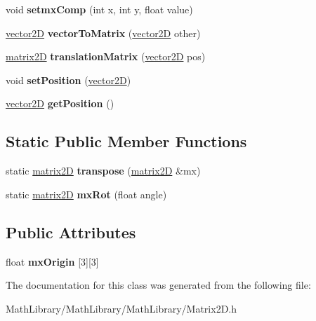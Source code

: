 \begin{DoxyCompactItemize}
\mbox{\label{classmatrix2_d_a939668139faca5cd4f52767a4db8c5e3}} 
void {\bfseries setmx\+Comp} (int x, int y, float value)
\item 
\mbox{\label{classmatrix2_d_ad98f4ee6d2e64acfde0c4ada1ccf0fcf}} 
\hyperlink{classvector2_d}{vector2D} {\bfseries vector\+To\+Matrix} (\hyperlink{classvector2_d}{vector2D} other)
\item 
\mbox{\label{classmatrix2_d_a23a306979fd8cecbfd7c1c8035d7e6bc}} 
\hyperlink{classmatrix2_d}{matrix2D} {\bfseries translation\+Matrix} (\hyperlink{classvector2_d}{vector2D} pos)
\item 
\mbox{\label{classmatrix2_d_aa422545fcd7ca7d549cb7273925295b9}} 
void {\bfseries set\+Position} (\hyperlink{classvector2_d}{vector2D})
\item 
\mbox{\label{classmatrix2_d_a7584dc759e94ed1a062493d081d79813}} 
\hyperlink{classvector2_d}{vector2D} {\bfseries get\+Position} ()
\end{DoxyCompactItemize}
\subsection*{Static Public Member Functions}
\begin{DoxyCompactItemize}
\item 
\mbox{\label{classmatrix2_d_a67d111b5a9ae50d68b422eb2e1254e5a}} 
static \hyperlink{classmatrix2_d}{matrix2D} {\bfseries transpose} (\hyperlink{classmatrix2_d}{matrix2D} \&mx)
\item 
\mbox{\label{classmatrix2_d_a8771a6d46410d910770e20cd44806214}} 
static \hyperlink{classmatrix2_d}{matrix2D} {\bfseries mx\+Rot} (float angle)
\end{DoxyCompactItemize}
\subsection*{Public Attributes}
\begin{DoxyCompactItemize}
\item 
\mbox{\label{classmatrix2_d_a2e1ca9e6aae44cd97b0a152f7792dd83}} 
float {\bfseries mx\+Origin} \mbox{[}3\mbox{]}\mbox{[}3\mbox{]}
\end{DoxyCompactItemize}


The documentation for this class was generated from the following file\+:\begin{DoxyCompactItemize}
\item 
Math\+Library/\+Math\+Library/\+Math\+Library/Matrix2\+D.\+h\end{DoxyCompactItemize}
